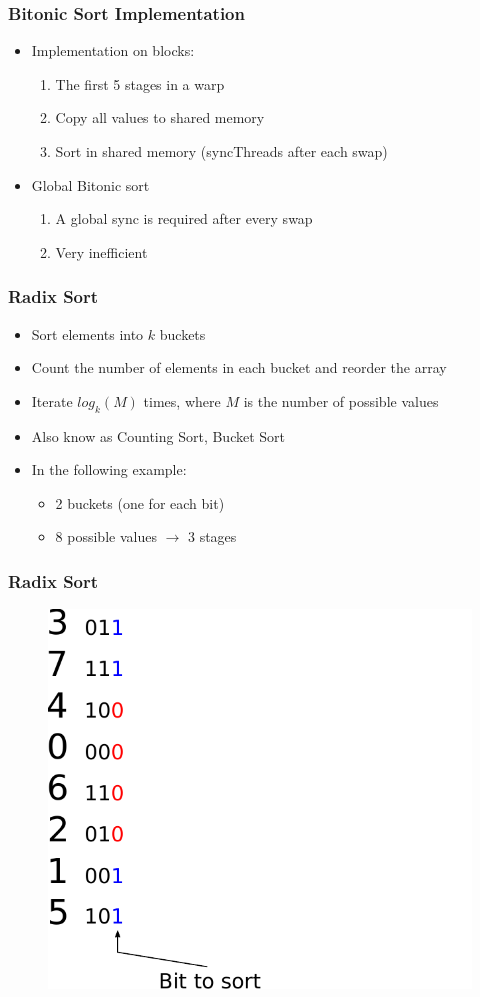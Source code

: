\documentclass[aspectratio=169]{beamer}
\begin{document}
\frame
{
	\frametitle{Bitonic Sort Implementation}
\begin{itemize}
	\item Implementation on blocks:
	\begin{enumerate}
		\item The first 5 stages in a warp 
		\item<2-> Copy all values to shared memory
		\item<2-> Sort in shared memory (syncThreads after each swap)
	\end{enumerate}
\item Global Bitonic sort
\begin{enumerate}
	\item A global sync is required after every swap
	\item<4->[$\rightarrow$] Very inefficient
\end{enumerate}
\end{itemize}
}

\frame
{
	\frametitle{Radix Sort}
	\begin{itemize}
		\item Sort elements into $k$ buckets
		\item Count the number of elements in each bucket and reorder the array
		\item Iterate $log_k(M)$ times, where $M$ is the number of possible values
		\item Also know as Counting Sort, Bucket Sort
		\item<2-> In the following example:
\begin{itemize}
	\item<2-> 2 buckets (one for each bit)
	\item<2-> 8 possible values $\rightarrow$ 3 stages
\end{itemize}
	\end{itemize}
}

\frame
{
	\frametitle{Radix Sort}
	\begin{figure}
		\centering
		\includegraphics[height=0.7\textheight]{radix0}
	\end{figure}
}
\end{document}
